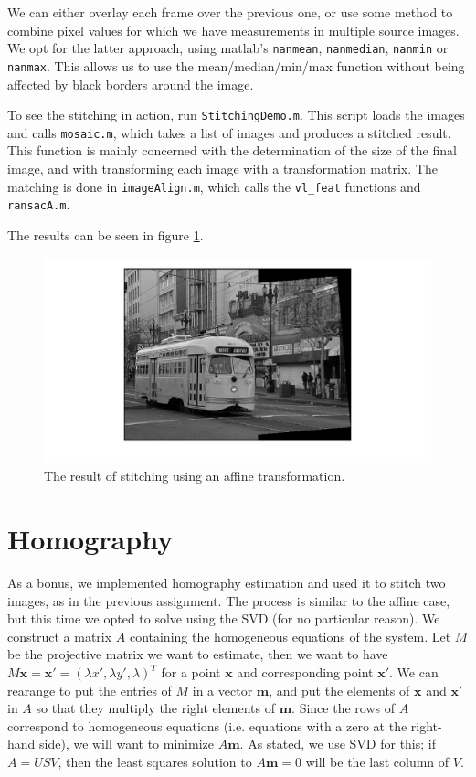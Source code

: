 \documentclass[a4paper,10pt]{article}
\begin{document}
We can either overlay each frame over the previous one, or use some method to combine pixel values for which we have measurements in multiple source images.
We opt for the latter approach, using matlab's \verb+nanmean+, \verb+nanmedian+, \verb+nanmin+ or \verb+nanmax+.
This allows us to use the mean/median/min/max function without being affected by black borders around the image.

To see the stitching in action, run \verb+StitchingDemo.m+.
This script loads the images and calls \verb+mosaic.m+, which takes a list of images and produces a stitched result.
This function is mainly concerned with the determination of the size of the final image, and with transforming each image with a transformation matrix.
The matching is done in \verb+imageAlign.m+, which calls the \verb+vl_feat+ functions and \verb+ransacA.m+.

The results can be seen in figure \ref{fig:affinestitch}.

\begin{figure}
\includegraphics[width=1\textwidth]{img/affinestitch}
\caption{The result of stitching using an affine transformation.}
\label{fig:affinestitch}
\end{figure}

\section{Homography}
As a bonus, we implemented homography estimation and used it to stitch two images, as in the previous assignment.
The process is similar to the affine case, but this time we opted to solve using the SVD (for no particular reason).
We construct a matrix $A$ containing the homogeneous equations of the system.
Let $M$ be the projective matrix we want to estimate, then we want to have $M\mathbf{x} = \mathbf{x'} = (\lambda x', \lambda y', \lambda)^T$ for a point $\mathbf{x}$ and corresponding point $\mathbf{x'}$.
We can rearange to put the entries of $M$ in a vector $\mathbf{m}$, and put the elements of $\mathbf{x}$ and $\mathbf{x'}$ in $A$ so that they multiply the right elements of $\mathbf{m}$.
Since the rows of $A$ correspond to homogeneous equations (i.e. equations with a zero at the right-hand side), we will want to minimize $A\mathbf{m}$.
As stated, we use SVD for this; if $A = U S V$, then the least squares solution to $A\mathbf{m} = 0$ will be the last column of $V$.
\end{document}
